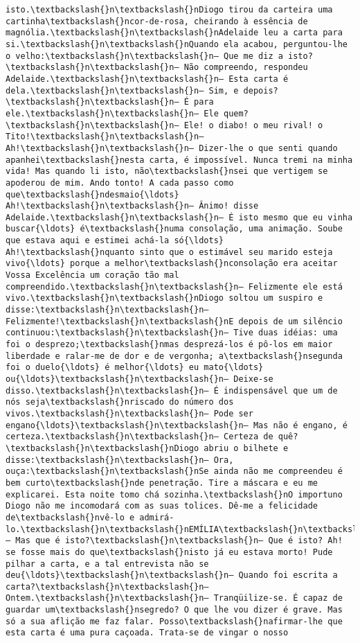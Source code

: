 \documentclass[11pt]{article}
\begin{document}
\begin{Verbatim}[commandchars=\\\{\}]
isto.\textbackslash{}n\textbackslash{}nDiogo tirou da carteira uma cartinha\textbackslash{}ncor-de-rosa, cheirando à essência de magnólia.\textbackslash{}n\textbackslash{}nAdelaide leu a carta para si.\textbackslash{}n\textbackslash{}nQuando ela acabou, perguntou-lhe o velho:\textbackslash{}n\textbackslash{}n— Que me diz a isto?\textbackslash{}n\textbackslash{}n— Não compreendo, respondeu Adelaide.\textbackslash{}n\textbackslash{}n— Esta carta é dela.\textbackslash{}n\textbackslash{}n— Sim, e depois?\textbackslash{}n\textbackslash{}n— É para ele.\textbackslash{}n\textbackslash{}n— Ele quem?\textbackslash{}n\textbackslash{}n— Ele! o diabo! o meu rival! o Tito!\textbackslash{}n\textbackslash{}n— Ah!\textbackslash{}n\textbackslash{}n— Dizer-lhe o que senti quando apanhei\textbackslash{}nesta carta, é impossível. Nunca tremi na minha vida! Mas quando li isto, não\textbackslash{}nsei que vertigem se apoderou de mim. Ando tonto! A cada passo como que\textbackslash{}ndesmaio{\ldots} Ah!\textbackslash{}n\textbackslash{}n— Ânimo! disse Adelaide.\textbackslash{}n\textbackslash{}n— É isto mesmo que eu vinha buscar{\ldots} é\textbackslash{}numa consolação, uma animação. Soube que estava aqui e estimei achá-la só{\ldots} Ah!\textbackslash{}nquanto sinto que o estimável seu marido esteja vivo{\ldots} porque a melhor\textbackslash{}nconsolação era aceitar Vossa Excelência um coração tão mal compreendido.\textbackslash{}n\textbackslash{}n— Felizmente ele está vivo.\textbackslash{}n\textbackslash{}nDiogo soltou um suspiro e disse:\textbackslash{}n\textbackslash{}n— Felizmente!\textbackslash{}n\textbackslash{}nE depois de um silêncio continuou:\textbackslash{}n\textbackslash{}n— Tive duas idéias: uma foi o desprezo;\textbackslash{}nmas desprezá-los é pô-los em maior liberdade e ralar-me de dor e de vergonha; a\textbackslash{}nsegunda foi o duelo{\ldots} é melhor{\ldots} eu mato{\ldots} ou{\ldots}\textbackslash{}n\textbackslash{}n— Deixe-se disso.\textbackslash{}n\textbackslash{}n— É indispensável que um de nós seja\textbackslash{}nriscado do número dos vivos.\textbackslash{}n\textbackslash{}n— Pode ser engano{\ldots}\textbackslash{}n\textbackslash{}n— Mas não é engano, é certeza.\textbackslash{}n\textbackslash{}n— Certeza de quê?\textbackslash{}n\textbackslash{}nDiogo abriu o bilhete e disse:\textbackslash{}n\textbackslash{}n— Ora, ouça:\textbackslash{}n\textbackslash{}nSe ainda não me compreendeu é bem curto\textbackslash{}nde penetração. Tire a máscara e eu me explicarei. Esta noite tomo chá sozinha.\textbackslash{}nO importuno Diogo não me incomodará com as suas tolices. Dê-me a felicidade de\textbackslash{}nvê-lo e admirá-lo.\textbackslash{}n\textbackslash{}nEMÍLIA\textbackslash{}n\textbackslash{}n— Mas que é isto?\textbackslash{}n\textbackslash{}n— Que é isto? Ah! se fosse mais do que\textbackslash{}nisto já eu estava morto! Pude pilhar a carta, e a tal entrevista não se deu{\ldots}\textbackslash{}n\textbackslash{}n— Quando foi escrita a carta?\textbackslash{}n\textbackslash{}n— Ontem.\textbackslash{}n\textbackslash{}n— Tranqüilize-se. É capaz de guardar um\textbackslash{}nsegredo? O que lhe vou dizer é grave. Mas só a sua aflição me faz falar. Posso\textbackslash{}nafirmar-lhe que esta carta é uma pura caçoada. Trata-se de vingar o nosso 
\end{Verbatim}
\end{document}
